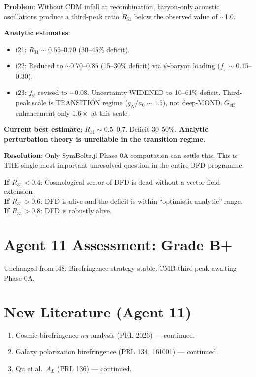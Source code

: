 \documentclass[11pt,a4paper]{article}
\begin{document}
\begin{tcolorbox}[colback=red!5!white, colframe=red!60!black,
  title={CMB Third Peak $R_{31}$: Status at Penultimate Iteration}]

\textbf{Problem}: Without CDM infall at recombination, baryon-only acoustic oscillations produce a third-peak ratio $R_{31}$ below the observed value of $\sim$1.0.

\textbf{Analytic estimates}:
\begin{itemize}
\item i21: $R_{31} \sim 0.55$--$0.70$ (30--45\% deficit).
\item i22: Reduced to $\sim$0.70--$0.85$ (15--30\% deficit) via $\psi$-baryon loading ($f_\psi \sim 0.15$--$0.30$).
\item i23: $f_\psi$ revised to $\sim$0.08. Uncertainty WIDENED to 10--61\% deficit. Third-peak scale is TRANSITION regime ($g_N / a_0 \sim 1.6$), not deep-MOND. $G_{\text{eff}}$ enhancement only $1.6\times$ at this scale.
\end{itemize}

\textbf{Current best estimate}: $R_{31} \sim 0.5$--$0.7$. Deficit 30--50\%. \textbf{Analytic perturbation theory is unreliable in the transition regime.}

\textbf{Resolution}: Only SymBoltz.jl Phase 0A computation can settle this. This is THE single most important unresolved question in the entire DFD programme.

\textbf{If $R_{31} < 0.4$}: Cosmological sector of DFD is dead without a vector-field extension.\\
\textbf{If $R_{31} > 0.6$}: DFD is alive and the deficit is within ``optimistic analytic'' range.\\
\textbf{If $R_{31} > 0.8$}: DFD is robustly alive.
\end{tcolorbox}

\section{Agent 11 Assessment: Grade B+}

Unchanged from i48. Birefringence strategy stable. CMB third peak awaiting Phase 0A.

\section{New Literature (Agent 11)}

\begin{enumerate}
\item Cosmic birefringence $n\pi$ analysis (PRL 2026) --- continued.
\item Galaxy polarization birefringence (PRL 134, 161001) --- continued.
\item Qu et al.\ $A_L$ (PRL 136) --- continued.
\end{enumerate}
\end{document}
